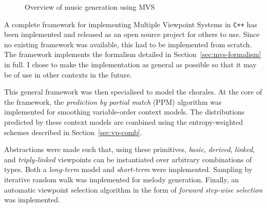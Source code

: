 \documentclass[12pt,a4paper,twoside,openright]{report}
\newcommand{\sref}[1]{Section~\ref{#1}}
\begin{document}
\begin{figure}[H]
\centering
{}
\caption{Overview of music generation using MVS}
\label{fig:mvs-gen-overview}
\end{figure}

A complete framework for implementing Multiple Viewpoint Systems in \verb!C++!
has been implemented and released as an open source project for others to use.
Since no existing framework was available, this had to be implemented from
scratch. The framework implements the formalism detailed in
\sref{sec:mvs-formalism} in full. I chose to make the implementation as
general as possible so that it may be of use in other contexts in the future. 

This general framework was then specialised to model the chorales. At the core
of the framework, the \emph{prediction by partial match} (PPM) algorithm was
implemented for smoothing variable-order context models. The distributions
predicted by these context models are combined using the entropy-weighted
schemes described in \sref{sec:vp-comb}.

Abstractions were made such that, using these primitives, \emph{basic},
\emph{derived}, \emph{linked}, and \emph{triply-linked} viewpoints can be
instantiated over arbitrary combinations of types. Both a \emph{long-term} model
and \emph{short-term} were implemented.  Sampling by iterative random walk was
implemented for melody generation. Finally, an automatic viewpoint selection
algorithm in the form of \emph{forward step-wise selection}
\cite{pearce2005construction} was implemented.
\end{document}
